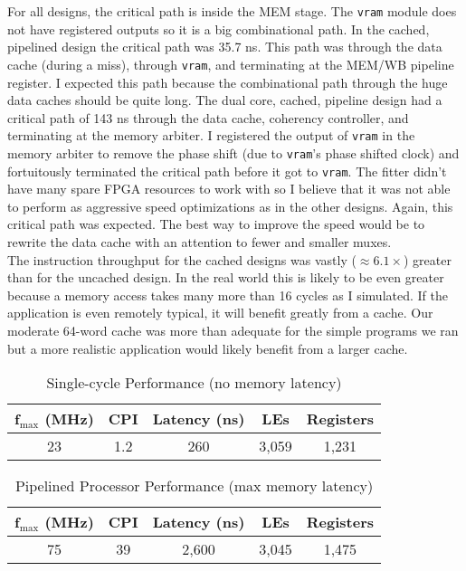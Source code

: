 \documentclass[12pt]{article}
\begin{document}
For all designs, the critical path is inside the MEM stage. The \texttt{vram} module does not have registered outputs so it is a big combinational path. In the cached, pipelined design the critical path was 35.7 ns. This path was through the data cache (during a miss), through \texttt{vram}, and terminating at the MEM/WB pipeline register. I expected this path because the combinational path through the huge data caches should be quite long. The dual core, cached, pipeline design had a critical path of 143 ns through the data cache, coherency controller, and terminating at the memory arbiter. I registered the output of \texttt{vram} in the memory arbiter to remove the phase shift (due to \texttt{vram}'s phase shifted clock) and fortuitously terminated the critical path before it got to \texttt{vram}. The fitter didn't have many spare FPGA resources to work with so I believe that it was not able to perform as aggressive speed optimizations as in the other designs. Again, this critical path was expected. The best way to improve the speed would be to rewrite the data cache with an attention to fewer and smaller muxes.\\

The instruction throughput for the cached designs was vastly ($\approx 6.1 \times$) greater than for the uncached design. In the real world this is likely to be even greater because a memory access takes many more than 16 cycles as I simulated. If the application is even remotely typical, it will benefit greatly from a cache. Our moderate 64-word cache was more than adequate for the simple programs we ran but a more realistic application would likely benefit from a larger cache.

\begin{table}
\begin{center}

  \caption{Single-cycle Performance (no memory latency)}
  \begin{tabular}{| c | c | c | c | c |}
  \hline
  f$_{\textrm{max}}$ (MHz) & CPI & Latency (ns) & LEs & Registers \\ \hline
 23 & 1.2 & 260 & 3,059 & 1,231 \\ \hline
  \end{tabular}
  \end{center}

  \label{tab:perf_single}
\end{table}

\begin{table}
\begin{center}

  \caption{Pipelined Processor Performance (max memory latency)}
  \begin{tabular}{| c | c | c | c | c |}
  \hline
  f$_{\textrm{max}}$ (MHz) & CPI & Latency (ns) & LEs & Registers \\ \hline
 75 & 39 & 2,600 &  3,045 & 1,475 \\ \hline
  \end{tabular}
  \end{center}

  \label{tab:perf_pipe}
\end{table}
\end{document}
